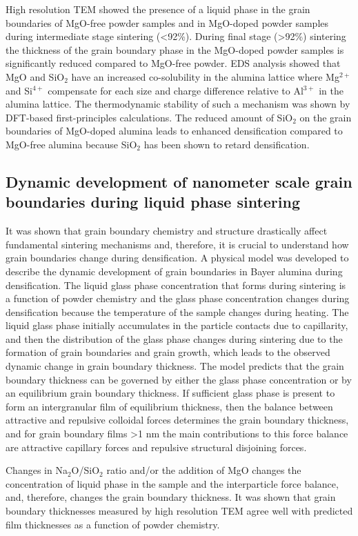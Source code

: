 High resolution TEM showed the presence of a liquid phase in the grain boundaries of MgO-free powder samples and in MgO-doped powder samples during intermediate stage sintering (<92\%). During final stage (>92\%) sintering the thickness of the grain boundary phase in the MgO-doped powder samples is significantly reduced compared to MgO-free powder. EDS analysis showed that MgO and SiO$_{2}$ have an increased co-solubility in the alumina lattice where Mg$^{2+}$ and Si$^{4+}$ compensate for each size and charge difference relative to Al$^{3+}$ in the alumina lattice. The thermodynamic stability of such a mechanism was shown by DFT-based first-principles calculations. The reduced amount of SiO$_{2}$ on the grain boundaries of MgO-doped alumina leads to enhanced densification compared to MgO-free alumina because SiO$_{2}$ has been shown to retard densification.

\subsection{Dynamic development of nanometer scale grain boundaries during liquid phase sintering}
It was shown that grain boundary chemistry and structure drastically affect fundamental sintering mechanisms and, therefore, it is crucial to understand how grain boundaries change during densification. A physical model was developed to describe the dynamic development of grain boundaries in Bayer alumina during densification. The liquid glass phase concentration that forms during sintering is a function of powder chemistry and the glass phase concentration changes during densification because the temperature of the sample changes during heating. The liquid glass phase initially accumulates in the particle contacts due to capillarity, and then the distribution of the glass phase changes during sintering due to the formation of grain boundaries and grain growth, which leads to the observed dynamic change in grain boundary thickness. The model predicts that the grain boundary thickness can be governed by either the glass phase concentration or by an equilibrium grain boundary thickness. If sufficient glass phase is present to form an intergranular film of equilibrium thickness, then the balance between attractive and repulsive colloidal forces determines the grain boundary thickness, and for grain boundary films >1 nm the main contributions to this force balance are attractive capillary forces and repulsive structural disjoining forces. 

Changes in Na$_{2}$O/SiO$_{2}$ ratio and/or the addition of MgO changes the concentration of liquid phase in the sample and the interparticle force balance, and, therefore, changes the grain boundary thickness. It was shown that grain boundary thicknesses measured by high resolution TEM agree well with predicted film thicknesses as a function of powder chemistry.  

